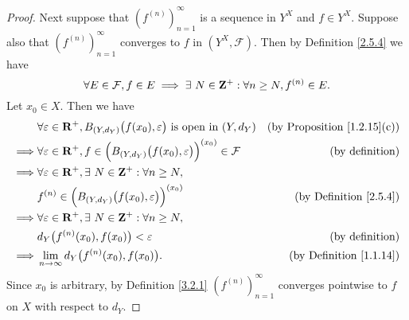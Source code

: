 \begin{proof}
    Next suppose that \((f^{(n)})_{n = 1}^\infty\) is a sequence in \(Y^X\) and \(f \in Y^X\).
    Suppose also that \((f^{(n)})_{n = 1}^\infty\) converges to \(f\) in \((Y^X, \mathcal{F})\).
    Then by Definition \ref{2.5.4} we have
    \[
        \forall E \in \mathcal{F}, f \in E \implies \exists\ N \in \mathbf{Z}^+ : \forall n \geq N, f^{(n)} \in E.
    \]
    Let \(x_0 \in X\).
    Then we have
    \begin{align*}
                 & \forall \varepsilon \in \mathbf{R}^+, B_{(Y, d_Y)}\big(f(x_0), \varepsilon\big) \text{ is open in } (Y, d_Y)            & \text{(by Proposition \ref{1.2.15}(c))} \\
        \implies & \forall \varepsilon \in \mathbf{R}^+, f \in \Big(B_{(Y, d_Y)}\big(f(x_0), \varepsilon\big)\Big)^{(x_0)} \in \mathcal{F} & \text{(by definition)}                  \\
        \implies & \forall \varepsilon \in \mathbf{R}^+, \exists\ N \in \mathbf{Z}^+ : \forall n \geq N,                                                                                     \\
                 & f^{(n)} \in \Big(B_{(Y, d_Y)}\big(f(x_0), \varepsilon\big)\Big)^{(x_0)}                                         & \text{(by Definition \ref{2.5.4})}      \\
        \implies & \forall \varepsilon \in \mathbf{R}^+, \exists\ N \in \mathbf{Z}^+ : \forall n \geq N,                                                                                     \\
                 & d_Y\big(f^{(n)}(x_0), f(x_0)\big) < \varepsilon                                                                 & \text{(by definition)}                  \\
        \implies & \lim_{n \to \infty} d_Y\big(f^{(n)}(x_0), f(x_0)\big).                                                          & \text{(by Definition \ref{1.1.14})}
    \end{align*}
    Since \(x_0\) is arbitrary, by Definition \ref{3.2.1} \((f^{(n)})_{n = 1}^\infty\) converges pointwise to \(f\) on \(X\) with respect to \(d_Y\).


\end{proof}
